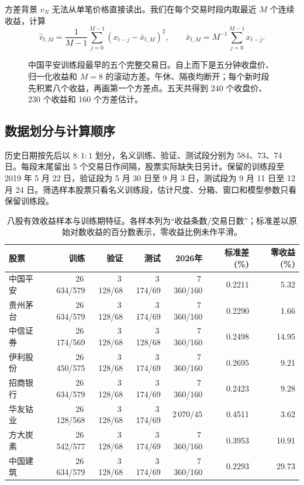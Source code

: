 \documentclass[11pt,a4paper]{article}
\newcommand{\chart}[4]{\begin{figure}[H]\centering\resizebox{#1\linewidth}{!}{}\caption{#3}\label{#4}\end{figure}}
\begin{document}
方差背景 $v_N$ 无法从单笔价格直接读出。我们在每个交易时段内取最近 $M$ 个连续收益，计算
\begin{equation}
 \widehat v_{t,M}=\frac{1}{M-1}\sum_{j=0}^{M-1}(x_{t-j}-\bar x_{t,M})^2,\qquad
 \bar x_{t,M}=M^{-1}\sum_{j=0}^{M-1}x_{t-j}. \label{eq:local}
\end{equation}
\chart{.83}{model_data_overview}{中国平安训练段最早的五个完整交易日。自上而下是五分钟收盘价、归一化收益和 $M=8$ 的滚动方差。午休、隔夜均断开；每个新时段先积累八个收益，再画第一个方差点。五天共得到 240 个收盘价、230 个收益和 160 个方差估计。}{fig:observations}

\clearpage
\subsection{数据划分与计算顺序}
历史日期按先后以 $8:1:1$ 划分，名义训练、验证、测试段分别为 584、73、74 日。每段末尾留出 5 个交易日作间隔，股票实际缺失日另计。保留的训练段至 2019 年 5 月 22 日，验证段为 5 月 30 日至 9 月 3 日，测试段为 9 月 11 日至 12 月 24 日。筛选样本股票只看名义训练段，估计尺度、分箱、窗口和模型参数只看保留训练段。
\begin{table}[H]\centering\small
\caption{八股有效收益样本与训练期特征。各样本列为“收益条数/交易日数”；标准差以原始对数收益的百分数表示，零收益比例未作平滑。}
\label{tab:eight_counts}
\begin{tabular}{lrrrrrr}\toprule
股票 & 训练 & 验证 & 测试 & 2026年 & 标准差(\%) & 零收益(\%)\\\midrule
中国平安 & 26\,634/579 & 3\,128/68 & 3\,174/69 & 7\,360/160 & 0.2211 & 5.32\\
贵州茅台 & 26\,634/579 & 3\,128/68 & 3\,174/69 & 7\,360/160 & 0.2290 & 1.66\\
中信证券 & 26\,174/569 & 3\,128/68 & 3\,128/68 & 7\,360/160 & 0.2498 & 14.95\\
伊利股份 & 26\,450/575 & 3\,128/68 & 3\,174/69 & 7\,360/160 & 0.2695 & 9.21\\
招商银行 & 26\,634/579 & 3\,128/68 & 3\,174/69 & 7\,360/160 & 0.2423 & 9.28\\
华友钴业 & 26\,128/568 & 3\,128/68 & 3\,174/69 & 2\,070/45 & 0.4511 & 3.62\\
方大炭素 & 26\,542/577 & 3\,128/68 & 3\,174/69 & 7\,360/160 & 0.3953 & 10.91\\
中国建筑 & 26\,634/579 & 3\,128/68 & 3\,174/69 & 7\,360/160 & 0.2293 & 29.73\\
\bottomrule\end{tabular}\end{table}
\end{document}
